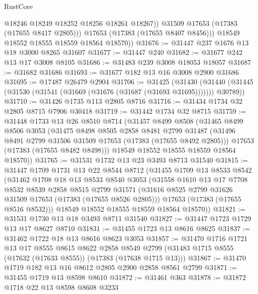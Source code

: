 \begin{lexlean}{RustCore}
\begin{coremodule}
                @18246
                @18249
                @18252
                @18256
                @18261
                @18267))
            @31509
            @17653
            (@17383 (@17655 @8417 @2805)))
          @17653
          (@17383 (@17655 @8407 @8456)))
        @18549
        @18552
        @18555
        @18559
        @18564
        @18570))
@31676 := @31447 @237 @1676 @13 @18 @3000 @8265 @31607
@31677 := @31447 @240
@31682 := @31677 @242 @13 @17 @3008 @8105
@31686 := @31483 @239 @3008 @18053 @18057
@31687 := @31682 @31686
@31693 := @31677 @182 @13 @16 @3008 @2900 @31686
@31695 := @17487 @26479 @2904
@31706 := @31425
    (@31430 (@31440 (@31445 (@31530 (@31541 (@31669 (@31676 (@31687 (@31693 @31695))))))) @30789))
@31710 := @31426 @1735 @113 @2805 @8716
@31716 := @31434 @1734 @32 @2805 @8715 @7906 @30418
@31719 := @31442 @1734 @32 @8715
@31759 := @31448
    @1733
    @13
    @26
    @8510
    @8714
    (@31457
      @8499
      @8508
      (@31465
        @8499
        @8506
        @3053
        (@31475
          @8498
          @8505
          @2858
          @8481
          @2799
          @31487
          (@31496 @8491 @2799 @31506 @31509 @17653 (@17383 (@17655 @8492 @2805)))
          @17653
          (@17383 (@17655 @8482 @8498)))
        @18549
        @18552
        @18555
        @18559
        @18564
        @18570))
@31765 := @31531 @1732 @13 @23 @3493 @8713 @31540
@31815 := @31447
    @1709
    @1731
    @13
    @22
    @8544
    @8712
    (@31455
      @1709
      @13
      @8533
      @8542
      (@31462
        @1708
        @18
        @13
        @8533
        @8540
        @3053
        (@31558
          @1610
          @13
          @17
          @7708
          @8532
          @8539
          @2858
          @8515
          @2799
          @31571
          (@31616 @8525 @2799 @31626 @31509 @17653 (@17383 (@17655 @8526 @2805)))
          @17653
          (@17383 (@17655 @8516 @8532)))
        @18549
        @18552
        @18555
        @18559
        @18564
        @18570))
@31821 := @31531 @1730 @13 @18 @3493 @8711 @31540
@31827 := @31447 @1723 @1729 @13 @17 @8627 @8710
@31831 := @31455 @1723 @13 @8616 @8625
@31837 := @31462 @1722 @18 @13 @8616 @8623 @3053
@31857 := @31470
    @1716
    @1721
    @13
    @17
    @8555
    @8615
    @8622
    @2858
    @8549
    @2799
    (@31483 @1715 @8555 (@17632 (@17633 @8555)) (@17383 (@17638 @1715 @13)))
@31867 := @31470 @1719 @182 @13 @16 @8612 @2805 @2900 @2858 @8561 @2799
@31871 := @31455 @1719 @13 @8598 @8610
@31872 := @31461 @363
@31878 := @31872 @1718 @22 @13 @8598 @8608 @3233

\end{coremodule}
\end{lexlean}
